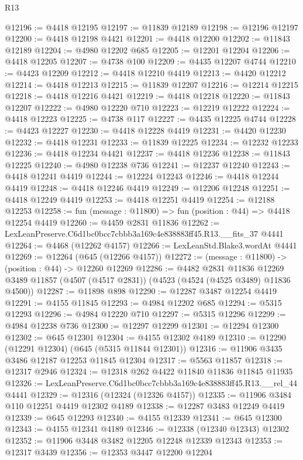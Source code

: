 \begin{lexlean}{R13}
\begin{coremodule}
@12196 := @4418 @12195
@12197 := @11839 @12189
@12198 := @12196 @12197
@12200 := @4418 @12198 @4421
@12201 := @4418 @12200
@12202 := @11843 @12189
@12204 := @4980 @12202 @685
@12205 := @12201 @12204
@12206 := @4418 @12205
@12207 := @4738 @100
@12209 := @4435 @12207 @4744
@12210 := @4423 @12209
@12212 := @4418 @12210 @4419
@12213 := @4420 @12212
@12214 := @4418 @12213
@12215 := @11839 @12207
@12216 := @12214 @12215
@12218 := @4418 @12216 @4421
@12219 := @4418 @12218
@12220 := @11843 @12207
@12222 := @4980 @12220 @710
@12223 := @12219 @12222
@12224 := @4418 @12223
@12225 := @4738 @117
@12227 := @4435 @12225 @4744
@12228 := @4423 @12227
@12230 := @4418 @12228 @4419
@12231 := @4420 @12230
@12232 := @4418 @12231
@12233 := @11839 @12225
@12234 := @12232 @12233
@12236 := @4418 @12234 @4421
@12237 := @4418 @12236
@12238 := @11843 @12225
@12240 := @4980 @12238 @736
@12241 := @12237 @12240
@12243 := @4418 @12241 @4419
@12244 := @12224 @12243
@12246 := @4418 @12244 @4419
@12248 := @4418 @12246 @4419
@12249 := @12206 @12248
@12251 := @4418 @12249 @4419
@12253 := @4418 @12251 @4419
@12254 := @12188 @12253
@12258 := fun (message : @11800) => fun (position : @44) => @4418 @12254 @4419
@12260 := @4459 @2831 @11836
@12262 := LexLeanPreserve.C6d1bc0bcc7cbbb3a169c4e838883ff45.R13.__fits_37 @4441
@12264 := @4468 (@12262 @4157)
@12266 := LexLeanStd.Blake3.wordAt @4441
@12269 := @12264 (@645 (@12266 @4157))
@12272 := (message : @11800) -> (position : @44) -> @12260 @12269
@12286 := @4482
    @2831
    @11836
    @12269
    @3489
    @11857
    (@4507 (@4517 @2831))
    (@4523 (@4524 (@4525 @3489) @11836 @4500))
@12287 := @11898 @898
@12290 := @12287 @3487 @12254 @4419
@12291 := @4155 @11845
@12293 := @4984 @12202 @685
@12294 := @5315 @12293
@12296 := @4984 @12220 @710
@12297 := @5315 @12296
@12299 := @4984 @12238 @736
@12300 := @12297 @12299
@12301 := @12294 @12300
@12302 := @645 @12301
@12304 := @4155 @12302 @4189
@12310 := @12290 (@12291 @12304) (@645 (@5315 @11844 @12301))
@12316 := @11906 @3435 @3486 @12187 @12253 @11845 @12304
@12317 := @5563 @11857
@12318 := @12317 @2946
@12324 := @12318 @262 @4422 @11840 @11836 @11845 @11935
@12326 := LexLeanPreserve.C6d1bc0bcc7cbbb3a169c4e838883ff45.R13.__rel_44 @4441
@12329 := @12316 (@12324 (@12326 @4157))
@12335 := @11906 @3484 @110 @12251 @4419 @12302 @4189
@12338 := @12287 @3483 @12249 @4419
@12339 := @645 @12293
@12340 := @4155 @12339
@12341 := @645 @12300
@12343 := @4155 @12341 @4189
@12346 := @12338 (@12340 @12343) @12302
@12352 := @11906 @3448 @3482 @12205 @12248 @12339 @12343
@12353 := @12317 @3439
@12356 := @12353 @3447 @12200 @12204

\end{coremodule}
\end{lexlean}
